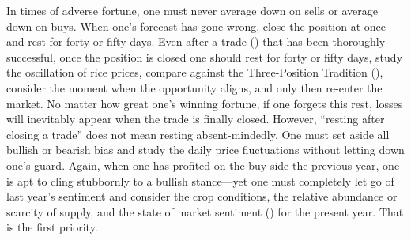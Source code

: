 \begin{sokyubox}
{\small\itshape\color{sokyubar} }

\medskip
In times of adverse fortune, one must never average down on sells
or average down on buys. When one's forecast has gone wrong, close
the position at once and rest for forty or fifty days. Even after
a trade () that has been thoroughly successful, once
the position is closed one should rest for forty or fifty days,
study the oscillation of rice prices, compare against the
Three-Position Tradition (), consider the
moment when the opportunity aligns, and only then re-enter the
market. No matter how great one's winning fortune, if one forgets
this rest, losses will inevitably appear when the trade is finally
closed. However, ``resting after closing a trade'' does not mean
resting absent-mindedly. One must set aside all bullish or bearish
bias and study the daily price fluctuations without letting down
one's guard. Again, when one has profited on the buy side
the previous year, one is apt to cling
stubbornly to a bullish stance---yet one must completely let go of
last year's sentiment and consider the crop conditions, the
relative abundance or scarcity of supply, and the state of market
sentiment () for the present year. That is the first
priority.
\end{sokyubox}

